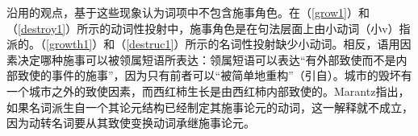 \eal
\label{destroy1}
\zl

\eal
\label{destruc1}
\zl

\noindent
沿用\citet{Chomsky70a}的观点，\citet{Marantz97a}基于这些现象认为词项中不包含施事角色。在（\ref{grow1}）和（\ref{destroy1}）所示的动词性投射中，施事角色是在句法层面上由小动词（小v）指派的。（\ref{growth1}）和（\ref{destruc1}）所示的名词性投射缺少小动词。相反，语用因素决定哪种施事可以被领属短语所表达：领属短语可以表达“有外部致使而不是内部致使的事件的施事”，因为只有前者可以“被简单地重构”（引自\citet[]{Marantz97a}）。城市的毁坏有一个城市之外的致使因素，而西红柿生长是由西红柿内部致使的\citep{Smith70a-u}。Marantz指出，如果名词派生自一个其论元结构已经制定其施事论元的动词，这一解释就不成立，因为动转名词要从其致使变换动词承继施事论元。

